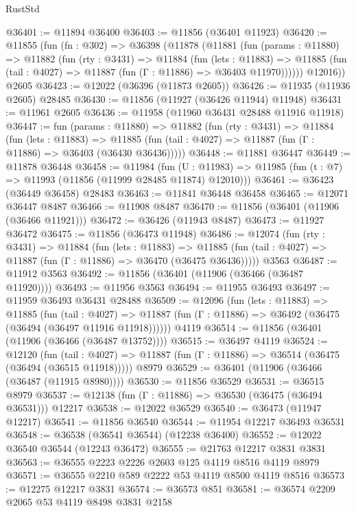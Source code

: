 \begin{lexlean}{RustStd}
\begin{coremodule}
@36401 := @11894 @36400
@36403 := @11856 (@36401 @11923)
@36420 := @11855
    (fun (fn : @302) =>
    @36398
      (@11878
        (@11881
          (fun (params : @11880) =>
          @11882
            (fun (rty : @3431) =>
            @11884
              (fun (lets : @11883) =>
              @11885 (fun (tail : @4027) => @11887 (fun (Γ : @11886) => @36403 @11970))))))
        @12016))
    @2605
@36423 := @12022 (@36396 (@11873 @2605))
@36426 := @11935 (@11936 @2605) @28485
@36430 := @11856 (@11927 (@36426 @11944) @11948)
@36431 := @11961 @2605
@36436 := @11958 (@11960 @36431 @28488 @11916 @11918)
@36447 := fun (params : @11880) =>
  @11882
    (fun (rty : @3431) =>
    @11884
      (fun (lets : @11883) =>
      @11885 (fun (tail : @4027) => @11887 (fun (Γ : @11886) => @36403 (@36430 @36436)))))
@36448 := @11881 @36447
@36449 := @11878 @36448
@36458 := @11984
    (fun (U : @11983) => @11985 (fun (t : @7) => @11993 (@11856 (@11999 @28485 @11874) @12010)))
@36461 := @36423 (@36449 @36458) @28483
@36463 := @11841 @36448 @36458
@36465 := @12071 @36447 @8487
@36466 := @11908 @8487
@36470 := @11856 (@36401 (@11906 (@36466 @11921)))
@36472 := @36426 (@11943 @8487)
@36473 := @11927 @36472
@36475 := @11856 (@36473 @11948)
@36486 := @12074
    (fun (rty : @3431) =>
    @11884
      (fun (lets : @11883) =>
      @11885 (fun (tail : @4027) => @11887 (fun (Γ : @11886) => @36470 (@36475 @36436)))))
    @3563
@36487 := @11912 @3563
@36492 := @11856 (@36401 (@11906 (@36466 (@36487 @11920))))
@36493 := @11956 @3563
@36494 := @11955 @36493
@36497 := @11959 @36493 @36431 @28488
@36509 := @12096
    (fun (lets : @11883) =>
    @11885
      (fun (tail : @4027) =>
      @11887 (fun (Γ : @11886) => @36492 (@36475 (@36494 (@36497 @11916 @11918))))))
    @4119
@36514 := @11856 (@36401 (@11906 (@36466 (@36487 @13752))))
@36515 := @36497 @4119
@36524 := @12120
    (fun (tail : @4027) => @11887 (fun (Γ : @11886) => @36514 (@36475 (@36494 (@36515 @11918)))))
    @8979
@36529 := @36401 (@11906 (@36466 (@36487 (@11915 @8980))))
@36530 := @11856 @36529
@36531 := @36515 @8979
@36537 := @12138 (fun (Γ : @11886) => @36530 (@36475 (@36494 @36531))) @12217
@36538 := @12022 @36529
@36540 := @36473 (@11947 @12217)
@36541 := @11856 @36540
@36544 := @11954 @12217 @36493 @36531
@36548 := @36538 (@36541 @36544) (@12238 @36400)
@36552 := @12022 @36540 @36544 (@12243 @36472)
@36555 := @21763 @12217 @3831 @3831
@36563 := @36555 @2223 @2226 @2603 @125 @4119 @8516 @4119 @8979
@36571 := @36555 @2210 @589 @2222 @53 @4119 @8500 @4119 @8516
@36573 := @12275 @12217 @3831
@36574 := @36573 @851
@36581 := @36574 @2209 @2065 @53 @4119 @8498 @3831 @2158

\end{coremodule}
\end{lexlean}
